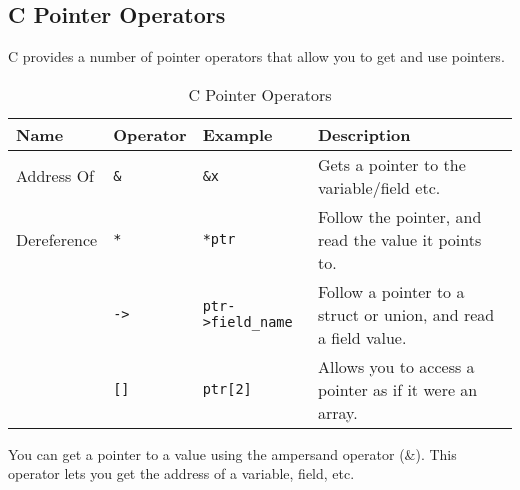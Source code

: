 \clearpage

\subsection{C Pointer Operators} %
\label{sub:c_pointer_operators}

C provides a number of pointer operators that allow you to get and use pointers.

\begin{table}[h]
  \centering
  \begin{tabular}{|l|l|l|p{8cm}|}
    \hline
    \textbf{Name} & \textbf{Operator}  & \textbf{Example}  & \textbf{Description} \\
    \hline
    Address Of & \texttt{\&} & \texttt{\&x} & Gets a pointer to the variable/field etc. \\
    \hline
    Dereference & \texttt{*} & \texttt{*ptr} & Follow the pointer, and read the value it points to.\\
    \hline
    & \texttt{->} & \texttt{ptr->field\_name} & Follow a pointer to a struct or union, and read a field value. \\
    \hline
    & \texttt{[]} & \texttt{ptr[2]} & Allows you to access a pointer as if it were an array. \\
    \hline
  \end{tabular}
  \caption{C Pointer Operators}
  \label{tbl:c-ptr-operators}
\end{table}

You can get a pointer to a value using the ampersand operator (\&). This operator lets you get the address of a variable, field, etc.



